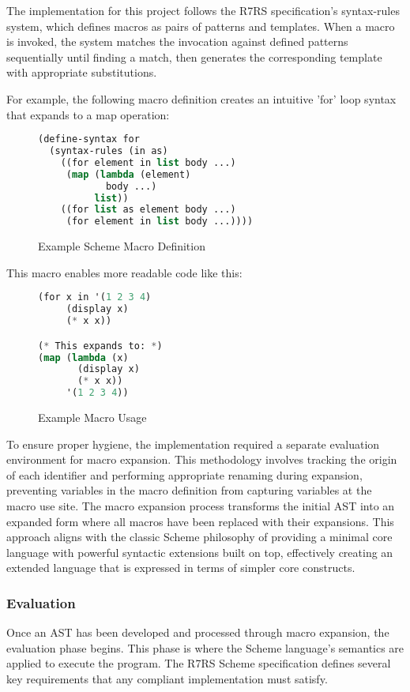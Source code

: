 \documentclass[final]{cmpreport_02}
\begin{document}
The implementation for this project follows the R7RS specification's syntax-rules system, which defines macros as pairs of patterns and templates. When a macro is invoked, the system matches the invocation against defined patterns sequentially until finding a match, then generates the corresponding template with appropriate substitutions.

For example, the following macro definition creates an intuitive 'for' loop syntax that expands to a map operation:

\begin{figure}[h!]
\caption{Example Scheme Macro Definition}
\begin{lstlisting}[language=Lisp]
(define-syntax for
  (syntax-rules (in as)
    ((for element in list body ...)
     (map (lambda (element)
            body ...)
          list))
    ((for list as element body ...)
     (for element in list body ...))))
\end{lstlisting}
\end{figure}

This macro enables more readable code like this:

\begin{figure}[h!]
\caption{Example Macro Usage}
\begin{lstlisting}[language=Lisp]
(for x in '(1 2 3 4)
     (display x)
     (* x x))

(* This expands to: *)
(map (lambda (x)
       (display x)
       (* x x))
     '(1 2 3 4))

\end{lstlisting}
\end{figure}

To ensure proper hygiene, the implementation required a separate evaluation environment for macro expansion. This methodology involves tracking the origin of each identifier and performing appropriate renaming during expansion, preventing variables in the macro definition from capturing variables at the macro use site.
The macro expansion process transforms the initial AST into an expanded form where all macros have been replaced with their expansions. This approach aligns with the classic Scheme philosophy of providing a minimal core language with powerful syntactic extensions built on top, effectively creating an extended language that is expressed in terms of simpler core constructs.

\subsubsection{Evaluation}
Once an AST has been developed and processed through macro expansion, the evaluation phase begins. This phase is where the Scheme language's semantics are applied to execute the program. The R7RS Scheme specification defines several key requirements that any compliant implementation must satisfy.
\end{document}
